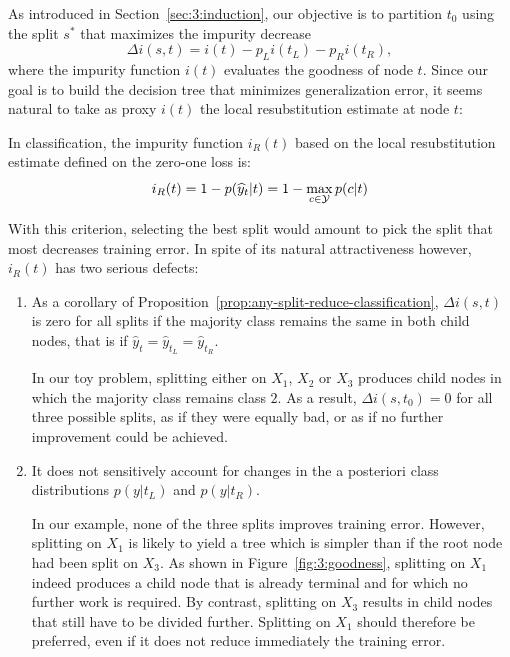 As introduced in Section~\ref{sec:3:induction}, our objective is to partition
$t_0$ using the split $s^*$ that maximizes the impurity decrease $$\Delta i(s,
t) = i(t) - p_L i(t_L) - p_R i(t_R),$$ where the impurity function $i(t)$
evaluates the goodness of node $t$. Since our goal is to build the decision
tree that minimizes generalization error, it seems natural to take as proxy
$i(t)$ the local resubstitution estimate at node $t$:
\begin{definition}
In classification, the impurity function $i_R(t)$ based on the local resubstitution estimate
defined on the zero-one loss is:
\begin{equation}\label{eqn:impurity:error}
i_R(t) = 1 - p(\widehat{y}_t|t) =  1 - \max_{c \in {\cal Y}} p(c|t)
\end{equation}
\end{definition}
With this criterion, selecting the best split would amount to pick the split that most
decreases training error. In spite of its natural attractiveness however,
$i_R(t)$ has two serious defects:
\begin{enumerate}
\item As a corollary of Proposition~\ref{prop:any-split-reduce-classification},
      $\Delta i(s, t)$ is zero for all splits if the majority class remains
      the same in both child nodes, that is if $\widehat{y}_t = \widehat{y}_{t_L} = \widehat{y}_{t_R}$.

      In our toy problem, splitting either on $X_1$, $X_2$ or $X_3$ produces
      child nodes in which the majority class remains class $2$. As a result,
      $\Delta i(s, t_0) = 0$ for all three possible splits, as if they were
      equally bad, or as if no further improvement could be achieved.

\item It does not sensitively account for changes in the a posteriori class
      distributions $p(y|t_L)$ and $p(y|t_R)$.

      In our example, none of the three splits improves training error. However,
      splitting on $X_1$ is likely to yield a tree which is simpler than if the
      root node had been split on $X_3$.  As shown in
      Figure~\ref{fig:3:goodness}, splitting on $X_1$ indeed produces a child
      node that is already terminal and for which no further work is required.
      By contrast, splitting on $X_3$ results in child nodes that still have to be
      divided further.  Splitting on $X_1$ should therefore be preferred, even
      if it does not reduce immediately the training error.
\end{enumerate}

